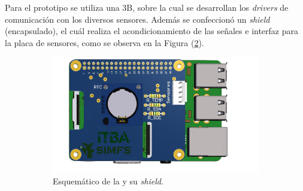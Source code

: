 
\Subsubsection{\rspi}
Para el prototipo se utiliza una \rspi 3B, sobre la cual se desarrollan los \textit{drivers} de comunicación con los diversos sensores. Además se confeccionó un \textit{shield} (encapsulado), el cuál realiza el acondicionamiento de las señales e interfaz para la placa de sensores, como se observa en la Figura (\ref{fig:shield}).
\begin{figure}[H]
    \centering
    \begin{subfigure}{0.5\textwidth}
		\centering
		\includegraphics[width=\linewidth,page=1]{ImagenesConstruccion del prototipo/shieldSensor}		
		\caption{Esquemático de la \rspi y su \textit{shield}.}
		\label{fig:shield}
	\end{subfigure}
    \caption*{}
\end{figure}
